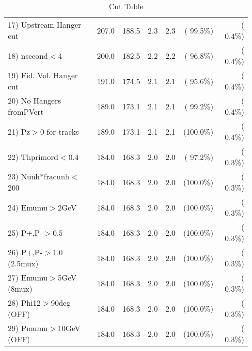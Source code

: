 \begin{table}[h!]
\begin{tabular}{||l||r|r|r|r|r|r||}
 17) Upstream Hanger cut  &        207.0 &        188.5 &          2.3 &          2.3 & ( 99.5\%) & (  0.4\%) \\
 18) nsecond$<$4          &        200.0 &        182.5 &          2.2 &          2.2 & ( 96.8\%) & (  0.4\%) \\
 19) Fid. Vol. Hanger cut &        191.0 &        174.5 &          2.1 &          2.1 & ( 95.6\%) & (  0.4\%) \\
 20) No Hangers fromPVert &        189.0 &        173.1 &          2.1 &          2.1 & ( 99.2\%) & (  0.4\%) \\
 21) Pz$>$0 for tracks    &        189.0 &        173.1 &          2.1 &          2.1 & (100.0\%) & (  0.4\%) \\
 22) Thprimord$<$0.4      &        184.0 &        168.3 &          2.0 &          2.0 & ( 97.2\%) & (  0.3\%) \\
 23) Nunh*fracunh$<$200   &        184.0 &        168.3 &          2.0 &          2.0 & (100.0\%) & (  0.3\%) \\
 24) Emumu$>$2GeV         &        184.0 &        168.3 &          2.0 &          2.0 & (100.0\%) & (  0.3\%) \\
 25) P+,P-$>$0.5          &        184.0 &        168.3 &          2.0 &          2.0 & (100.0\%) & (  0.3\%) \\
 26) P+,P-$>$1.0 (2.5mux) &        184.0 &        168.3 &          2.0 &          2.0 & (100.0\%) & (  0.3\%) \\
 27) Emumu$>$5GeV  (8mux) &        184.0 &        168.3 &          2.0 &          2.0 & (100.0\%) & (  0.3\%) \\
 28) Phi12$>$90deg  (OFF) &        184.0 &        168.3 &          2.0 &          2.0 & (100.0\%) & (  0.3\%) \\
 29) Pmumu$>$10GeV  (OFF) &        184.0 &        168.3 &          2.0 &          2.0 & (100.0\%) & (  0.3\%) \\
 \hline
 \hline
 \end{tabular}
 \caption{Cut Table           }
 \label{tab-cutcohjpsi-mumu_cohpip}
 \end{table}
